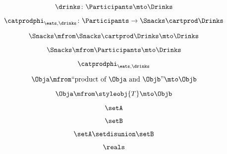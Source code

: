 {\begin{forslides}
    \begin{equation}
        \label{eq:feedback-053}
        \drinks\colon \Participants \mto \Drinks
    \end{equation}

    \begin{equation}
        \label{eq:feedback-054}
        \catprodphi_{\eats,\drinks} \colon \Participants \to \Snacks \cartprod \Drinks
    \end{equation}

    \begin{equation}
        \label{eq:feedback-055}
        \Snacks \mfrom \Snacks \cartprod \Drinks \mto \Drinks
    \end{equation}

    \begin{equation}
        \label{eq:feedback-056}
        \Snacks \mfrom  \Participants \mto \Drinks
    \end{equation}

    \begin{equation}
        \label{eq:feedback-057}
        \catprodphi_{\eats,\drinks}
    \end{equation}

    \begin{equation}
        \label{eq:feedback-058}
        \Obja \mfrom \text{``product of } \Obja \text{ and } \Objb \text{''}  \mto \Objb
    \end{equation}

    \begin{equation}
        \label{eq:feedback-059}
        \Obja \mfrom \styleobj{T} \mto \Objb
    \end{equation}

    \begin{equation}
        \label{eq:feedback-060}
        \setA
    \end{equation}

    \begin{equation}
        \label{eq:feedback-061}
        \setB
    \end{equation}

    \begin{equation}
        \label{eq:feedback-062}
        \setA \setdisunion \setB
    \end{equation}

    \begin{equation}
        \label{eq:feedback-063}
        \reals
    \end{equation}


\end{forslides}}
